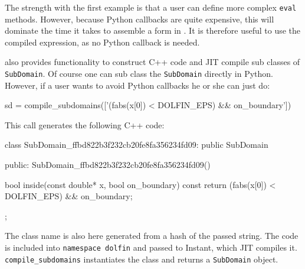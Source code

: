 \begin{code}
The strength with the first example is that a user can define more complex \texttt{eval} methods. However, because Python callbacks are quite expensive, this will dominate the time it takes to assemble a form in \pydolfin. It is therefore useful to use the compiled expression, as no Python callback is needed.\par

\pydolfin also provides functionality to construct C++ code and JIT compile sub classes of \texttt{SubDomain}. Of course one can sub class the \texttt{SubDomain} directly in Python. However, if a user wants to avoid Python callbacks he or she can just do:
\begin{code}
sd = compile_subdomains(['(fabs(x[0]) < DOLFIN_EPS) && on_boundary'])
\end{code}
This call generates the following C++ code:
\begin{code}
class SubDomain_ffbd822b3f232cb20fe8fa356234fd09: public SubDomain
{
public:
  SubDomain_ffbd822b3f232cb20fe8fa356234fd09(){}

  bool inside(const double* x, bool on_boundary) const{
      return (fabs(x[0]) < DOLFIN_EPS) && on_boundary;
  }
};
\end{code}
The class name is also here generated from a hash of the passed string. The code is included into \texttt{namespace dolfin} and passed to Instant, which JIT compiles it. \texttt{compile}\texttt{\_subdomains} instantiates the class and returns a \texttt{SubDomain} object.\par

%
%
%


\end{code}
